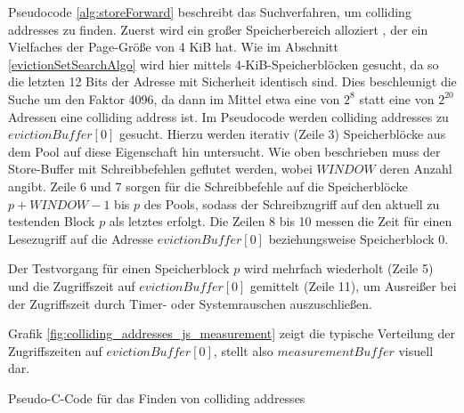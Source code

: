 Pseudocode \ref{alg:storeForward} beschreibt das Suchverfahren, um colliding addresses zu finden.
Zuerst wird ein großer Speicherbereich alloziert %
, der ein Vielfaches der Page-Größe von 4 KiB hat.
Wie im Abschnitt \ref{evictionSetSearchAlgo} wird hier mittels 4-KiB-Speicherblöcken gesucht, da so die letzten 12 Bits der Adresse mit Sicherheit identisch sind.
Dies beschleunigt die Suche um den Faktor 4096, da dann im Mittel etwa eine von $2^8$ statt eine von $2^{20}$ Adressen eine colliding address ist.
Im Pseudocode werden colliding addresses zu $evictionBuffer[0]$ gesucht.
Hierzu werden iterativ (Zeile 3) Speicherblöcke aus dem Pool auf diese Eigenschaft hin untersucht.
Wie oben beschrieben muss der Store-Buffer mit Schreibbefehlen geflutet werden, wobei $WINDOW$ deren Anzahl angibt.
Zeile 6 und 7 sorgen für die Schreibbefehle auf die Speicherblöcke $p + WINDOW - 1$ bis $p$ des Pools, sodass der Schreibzugriff auf den aktuell zu testenden Block $p$ als letztes erfolgt.
Die Zeilen 8 bis 10 messen die Zeit für einen Lesezugriff auf die Adresse $evictionBuffer[0]$ beziehungsweise Speicherblock 0.

Der Testvorgang für einen Speicherblock $p$ wird mehrfach wiederholt (Zeile 5) und die Zugriffszeit auf $evictionBuffer[0]$ gemittelt (Zeile 11), um Ausreißer bei der Zugriffszeit durch Timer- oder Systemrauschen auszuschließen. 

Grafik \ref{fig:colliding_addresses_js_measurement} zeigt die typische Verteilung der Zugriffszeiten auf $evictionBuffer[0]$, stellt also $measurementBuffer$ visuell dar.






\begin{algorithm}[h]
\DontPrintSemicolon
\caption{Pseudo-C-Code für das Finden von colliding addresses}
\label{alg:storeForward}

\end{algorithm}

